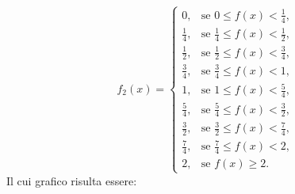 \[
f_{2}(x)=
\begin{cases}
0,          & \text{se } 0 \le f(x) < \tfrac14,\\[3pt]
\tfrac14,   & \text{se } \tfrac14 \le f(x) < \tfrac12,\\[3pt]
\tfrac12,   & \text{se } \tfrac12 \le f(x) < \tfrac34,\\[3pt]
\tfrac34,   & \text{se } \tfrac34 \le f(x) < 1,\\[3pt]
1,          & \text{se } 1 \le f(x) < \tfrac54,\\[3pt]
\tfrac54,   & \text{se } \tfrac54 \le f(x) < \tfrac32,\\[3pt]
\tfrac32,   & \text{se } \tfrac32 \le f(x) < \tfrac74,\\[3pt]
\tfrac74,   & \text{se } \tfrac74 \le f(x) < 2,\\[3pt]
2,          & \text{se } f(x) \ge 2.
\end{cases}
\]
\noindent Il cui grafico risulta essere:


